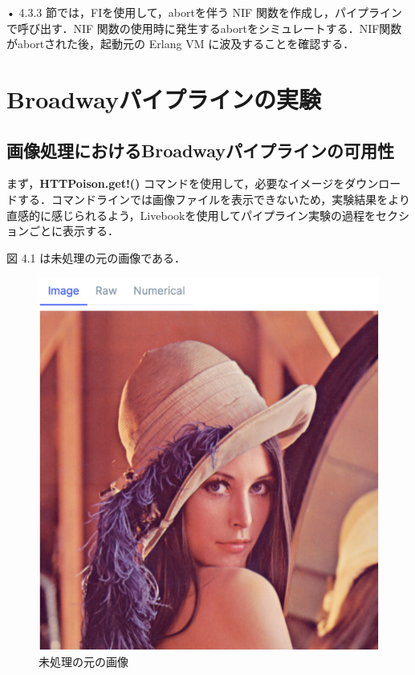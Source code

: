 \documentclass[a4paper]{jreport}	%
\begin{document}
• 4.3.3 節では，FIを使用して，abortを伴う NIF 関数を作成し，パイプラインで呼び出す．NIF 関数の使用時に発生するabortをシミュレートする．NIF関数がabortされた後，起動元の Erlang VM に波及することを確認する．


\section{Broadwayパイプラインの実験}

\subsection{画像処理におけるBroadwayパイプラインの可用性} 
まず，\textbf{HTTPoison.get!() }コマンドを使用して，必要なイメージをダウンロードする．コマンドラインでは画像ファイルを表示できないため，実験結果をより直感的に感じられるよう，Livebookを使用してパイプライン実験の過程をセクションごとに表示する．

図 4.1 は未処理の元の画像である．
\begin{figure}[H]
\vspace{8.5cm}
\begin{center}
\hspace{-8cm}
\includegraphics[scale=0.5]{ja/f3.png}
\end{center}
\caption{未処理の元の画像}
\end{figure}
\end{document}
